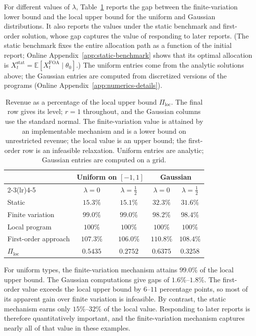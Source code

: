 \documentclass[12pt]{article}
\newcommand{\E}{\mathbb{E}}
\begin{document}
For different values of $\lambda$, 
Table~\ref{tab:app-bracket} reports the gap between the
finite-variation lower bound and the local upper bound for the uniform and Gaussian distributions. It also reports the values under the static benchmark and first-order solution, whose gap captures the value of responding to later reports. (The static
benchmark fixes the entire allocation path as a function of the initial report;
Online Appendix~\ref{app:static-benchmark} shows that its optimal allocation is
\(X_t^{\mathrm{stat}}=\E[X_t^{\mathrm{FOA}}\mid\theta_0]\).) The uniform
entries come from the analytic solutions above; the Gaussian entries
are computed from discretized versions of the programs
(Online Appendix~\ref{app:numerics-details}).

\begin{table}[ht]
\centering
\begin{tabular}{@{}lcccc@{}}
\toprule
& \multicolumn{2}{c}{Uniform on \([-1,1]\)}
& \multicolumn{2}{c}{Gaussian} \\
\cmidrule(lr){2-3}\cmidrule(lr){4-5}
& \(\lambda=0\) & \(\lambda=\tfrac12\)
& \(\lambda=0\) & \(\lambda=\tfrac12\) \\
\midrule
Static
& \(15.3\%\) & \(15.1\%\) & \(32.3\%\) & \(31.6\%\) \\
Finite variation
& \(99.0\%\) & \(99.0\%\) & \(98.2\%\) & \(98.4\%\) \\
Local program
& \(100\%\) & \(100\%\) & \(100\%\) & \(100\%\) \\
First-order approach
& \(107.3\%\) & \(106.0\%\) & \(110.8\%\) & \(108.4\%\) \\
\midrule
\(\Pi_{\mathrm{loc}}\)
& \(0.5435\) & \(0.2752\) & \(0.6375\) & \(0.3258\) \\
\bottomrule
\end{tabular}
\caption{Revenue as a percentage of the local upper bound
\(\Pi_{\mathrm{loc}}\). The final row gives its level; \(r=1\)
throughout, and the Gaussian columns use the standard normal. The finite-variation value is attained by an implementable
mechanism and is a lower bound on unrestricted revenue; the local value
is an upper bound; the first-order row is an infeasible relaxation.
Uniform entries are analytic; Gaussian entries are computed on a grid.}
\label{tab:app-bracket}
\end{table}

For uniform types, the finite-variation mechanism attains \(99.0\%\)
of the local upper bound. The Gaussian computations give gaps of
\(1.6\%\)--\(1.8\%\). The first-order value exceeds the local upper
bound by \(6\)--\(11\) percentage points, so most of its apparent gain
over finite variation is infeasible. By contrast, the static mechanism
earns only \(15\%\)--\(32\%\) of the local value. Responding to later
reports is therefore quantitatively important, and the finite-variation
mechanism captures nearly all of that value in these examples.
\end{document}
